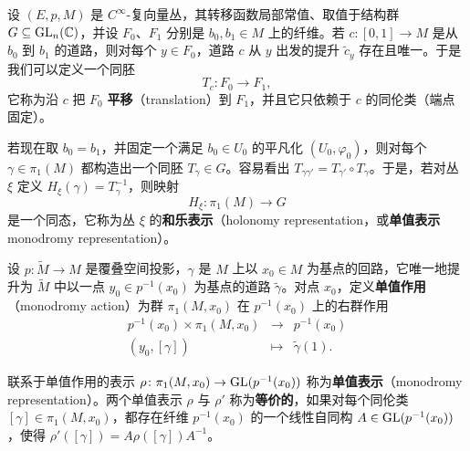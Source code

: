 \begin{definition}[3.25]
设 $(E,p,M)$ 是 $C^\infty$-复向量丛，其转移函数局部常值、取值于结构群 $G\subseteq\operatorname{GL}_n(\mathbb{C})$，并设 $F_0$、$F_1$ 分别是 $b_0,b_1\in M$ 上的纤维。若 $c\colon[0,1]\to M$ 是从 $b_0$ 到 $b_1$ 的道路，则对每个 $y\in F_0$，道路 $c$ 从 $y$ 出发的提升 $\tilde c_y$ 存在且唯一。于是我们可以定义一个同胚
\[
T_c\colon F_0\to F_1 ,
\]
它称为沿 $c$ 把 $F_0$ \textbf{平移}（translation）到 $F_1$，并且它只依赖于 $c$ 的同伦类（端点固定）。
\end{definition}

若现在取 $b_0=b_1$，并固定一个满足 $b_0\in U_0$ 的平凡化 $(U_0,\varphi_0)$，则对每个 $\gamma\in\pi_1(M)$ 都构造出一个同胚 $T_\gamma\in G$。容易看出 $T_{\gamma\gamma'}=T_{\gamma'}\circ T_\gamma$。于是，若对丛 $\xi$ 定义 $H_\xi(\gamma)=T_\gamma^{-1}$，则映射
\[
H_\xi\colon \pi_1(M)\to G
\]
是一个同态，它称为丛 $\xi$ 的\textbf{和乐表示}（holonomy representation，或\textbf{单值表示} monodromy representation）。

\begin{definition}[3.26]
设 $p\colon\tilde M\to M$ 是覆叠空间投影，$\gamma$ 是 $M$ 上以 $x_0\in M$ 为基点的回路，它唯一地提升为 $\tilde M$ 中以一点
$y_0\in p^{-1}(x_0)$ 为基点的道路 $\tilde\gamma$。对点 $x_0$，定义\textbf{单值作用}（monodromy action）为群 $\pi_1(M,x_0)$ 在 $p^{-1}(x_0)$ 上的右群作用
\[
\begin{array}{rcl}
p^{-1}(x_0)\times\pi_1(M,x_0) & \to & p^{-1}(x_0)\\[2pt]
(y_0,[\gamma]) & \mapsto & \tilde\gamma(1) .
\end{array}
\]
\end{definition}

联系于单值作用的表示 $\rho\colon\pi_1(M,x_0)\to\operatorname{GL}(p^{-1}(x_0))$ 称为\textbf{单值表示}（monodromy representation）。两个单值表示 $\rho$ 与 $\rho'$ 称为\textbf{等价的}，如果对每个同伦类 $[\gamma]\in\pi_1(M,x_0)$，都存在纤维 $p^{-1}(x_0)$ 的一个线性自同构 $A\in\operatorname{GL}(p^{-1}(x_0))$，使得 $\rho'([\gamma])=A\rho([\gamma])A^{-1}$。


